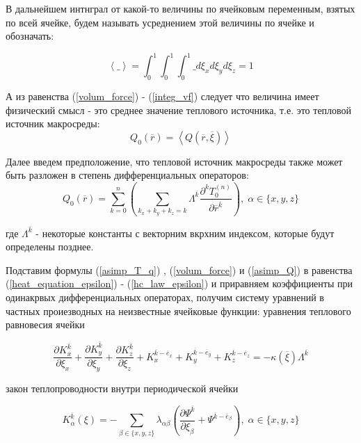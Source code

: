 В дальнейшем интнграл от какой-то величины по ячейковым переменным, взятых по всей ячейке, будем называть усреднением этой величины по ячейке и обозначать:

\begin{equation}
    \left< \_ \right> = \int_0^1 \int_0^1 \int_0^1 \_ d\xi_x d\xi_y d\xi_z = 1
\end{equation}

А из равенства 
(\ref{volum_force})
-
(\ref{integ_vf})
следует что величина имеет физический смысл - это среднее значение теплового источника, т.е. 
это тепловой источник макросреды:
\begin{equation}
    Q_0 \left( \overline{r} \right) = \left<  Q \left( \overline{r}, \overline{\xi} \right) \right>
\end{equation}

Далее введем предположение, что тепловой источник макросреды также может быть разложен в степень дифференциальных операторов:
\begin{equation}
    \label{asimp_Q}
    Q_0 \left( \overline{r} \right) = \sum^n_{k=0} \left( \sum_{k_x+k_y+k_z=k} \Lambda^{ \overline{k}} \frac{\partial^k T^{(n)}_0}{\partial \overline{r}^{ \overline{k}}} \right)
    , \; \alpha \in \{x,y,z\}
\end{equation}

где 
$\Lambda^{ \overline{k}}$ 
- некоторые константы с векторним вкрхним индексом, которые будут определены позднее.

Подставим формулы 
(\ref{asimp_T_q})
,
(\ref{volum_force})
и 
(\ref{asimp_Q})
в равенства 
(\ref{heat_equation_epsilon})
-
(\ref{hc_law_epsilon}) и 
приравняем коэффициенты при одинакрвых дифференциальных операторах, получим систему уравнений в частных проиезводных
на неизвестные ячейковые функции:
уравнения теплового равновесия ячейки

\begin{equation}
    \label{eq_eq_cell}
    \frac{\partial K^{ \overline{k}}_x}{\partial \xi_x}+
    \frac{\partial K^{ \overline{k}}_y}{\partial \xi_y}+
    \frac{\partial K^{ \overline{k}}_z}{\partial \xi_z}+
    K^{ \overline{k}- \overline{e}_x}_x+
    K^{ \overline{k}- \overline{e}_y}_y+
    K^{ \overline{k}- \overline{e}_z}_z=
    -\kappa \left( \overline{\xi} \right) \Lambda^{ \overline{k}}
\end{equation}

закон теплопроводности внутри периодической ячейки

\begin{equation}
    K^{ \overline{k}}_{\alpha} \left( \xi \right) = 
    - \sum_{\beta \in \{x,y,z\}} \lambda_{\alpha\beta} 
    \left(  \frac{\partial \Psi^{ \overline{k}}}{\partial \xi_{\beta}} + \Psi^{ \overline{k} - \overline{e}_{\beta}}\right)
    , \; \alpha \in \{x,y,z\}
\end{equation}

